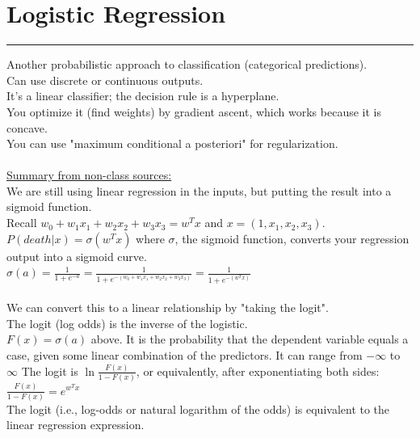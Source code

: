 \section{Logistic Regression}
\smallskip \hrule height 2pt \smallskip

Another probabilistic approach to classification (categorical predictions).   \hfill \\
Can use discrete or continuous outputs. \hfill \\ %
It's a linear classifier; the decision rule is a hyperplane. \hfill \\  %
You optimize it (find weights) by gradient ascent, which works because it is concave.    \hfill \\  %
You can use "maximum conditional a posteriori" for regularization.    \hfill \\  %

\hfill \\ 

\underline{Summary from non-class sources:} \hfill \\
We are still using linear regression in the inputs, but putting the result into a sigmoid function. \hfill \\
Recall $w_0 + w_1 x_1 + w_2 x_2 + w_3 x_3 = w^Tx$ and $x = (1, x_1, x_2, x_3)$.  \hfill \\
$P(death|x) = \sigma(w^Tx)$  %
where $\sigma$, the sigmoid function,  converts your regression output into a sigmoid curve. \hfill \\
$\displaystyle \sigma(a) = \frac{1}{1+ e^{-a}} = \frac{1}{1+ e^{-(w_0 + w_1 x_1 + w_2 x_2 + w_3 x_3)}} = \frac{1}{1+ e^{-(w^Tx)}}$   \hfill \\ %
\hfill \\

We can convert this to a linear relationship by "taking the logit". \hfill \\
The logit (log odds) is the inverse of the logistic.  \hfill \\ %
$F(x) = \sigma(a)$ above.  It is the probability that the dependent variable equals a case, given some linear combination of the predictors.  It can range from $- \infty$ to $\infty$   %
The logit is $\ln \frac{F(x)}{1-F(x)}$, or equivalently, after exponentiating both sides: \hfill \\
$\frac{F(x)}{1-F(x)} = e^{w^Tx}$  \hfill \\
The logit (i.e., log-odds or natural logarithm of the odds) is equivalent to the linear regression expression.

